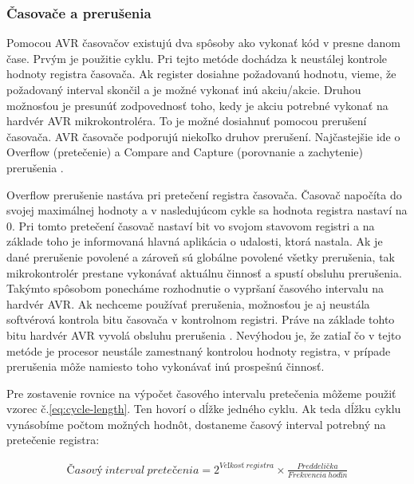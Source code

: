 \subsubsection{Časovače a prerušenia} \label{subsec:timers-interrupts}
\noindent \par
Pomocou AVR časovačov existujú dva spôsoby ako vykonať kód v presne danom čase. Prvým je použitie cyklu.
Pri tejto metóde dochádza k neustálej kontrole hodnoty registra časovača. Ak register dosiahne požadovanú hodnotu, vieme, že požadovaný interval skončil
a je možné vykonať inú akciu/akcie. Druhou možnosťou je presunúť zodpovednosť toho, kedy je akciu potrebné vykonať na hardvér AVR mikrokontroléra.
To je možné dosiahnuť pomocou prerušení časovača. AVR časovače podporujú niekoľko druhov prerušení.
Najčastejšie ide o Overflow (pretečenie) a Compare and Capture (porovnanie a zachytenie) prerušenia \cite{atmelATmega64012801281}. \par
Overflow prerušenie nastáva pri pretečení registra časovača. Časovač napočíta do svojej maximálnej hodnoty a v nasledujúcom cykle sa hodnota registra nastaví na 0.
Pri tomto pretečení časovač nastaví bit vo svojom stavovom registri a na základe toho je informovaná hlavná aplikácia o udalosti, ktorá nastala. Ak je dané prerušenie
povolené a zároveň sú globálne povolené všetky prerušenia, tak mikrokontrolér prestane vykonávať aktuálnu činnosť a spustí obsluhu prerušenia. Takýmto spôsobom
ponecháme rozhodnutie o vypršaní časového intervalu na hardvér AVR. Ak nechceme používať prerušenia, možnosťou je aj neustála softvérová kontrola bitu časovača v kontrolnom registri.
Práve na základe tohto bitu hardvér AVR vyvolá obsluhu prerušenia \cite{atmelATmega64012801281}. Nevýhodou je, že zatiaľ čo v tejto metóde je procesor neustále zamestnaný kontrolou
hodnoty registra, v prípade prerušenia môže namiesto toho vykonávať inú prospešnú činnosť. \par
Pre zostavenie rovnice na výpočet časového intervalu pretečenia môžeme použiť vzorec č.\ref{eq:cycle-length}. Ten hovorí o dĺžke jedného cyklu. Ak teda dĺžku cyklu
vynásobíme počtom možných hodnôt, dostaneme časový interval potrebný na pretečenie registra:

\begin{equation} \label{eq:overflow-frequency}
    \begin{aligned}
        Časový\:interval\:pretečenia =  2^{Veľkosť\:registra}  \times \frac{Preddelička}{Frekvencia\:hodín}
    \end{aligned}
\end{equation}

